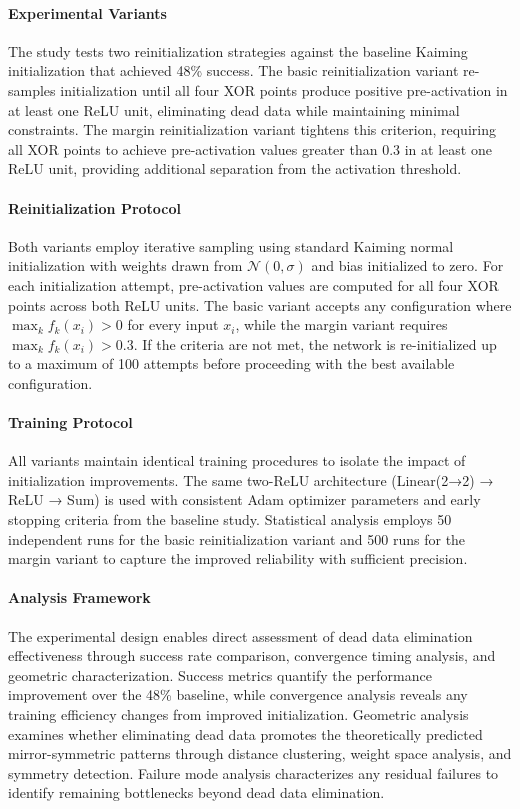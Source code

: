 \paragraph{Experimental Variants}
The study tests two reinitialization strategies against the baseline Kaiming initialization that achieved 48\% success. The basic reinitialization variant re-samples initialization until all four XOR points produce positive pre-activation in at least one ReLU unit, eliminating dead data while maintaining minimal constraints. The margin reinitialization variant tightens this criterion, requiring all XOR points to achieve pre-activation values greater than 0.3 in at least one ReLU unit, providing additional separation from the activation threshold.

\paragraph{Reinitialization Protocol}
Both variants employ iterative sampling using standard Kaiming normal initialization with weights drawn from $\mathcal{N}(0, \sigma)$ and bias initialized to zero. For each initialization attempt, pre-activation values are computed for all four XOR points across both ReLU units. The basic variant accepts any configuration where $\max_k f_k(x_i) > 0$ for every input $x_i$, while the margin variant requires $\max_k f_k(x_i) > 0.3$. If the criteria are not met, the network is re-initialized up to a maximum of 100 attempts before proceeding with the best available configuration.

\paragraph{Training Protocol}
All variants maintain identical training procedures to isolate the impact of initialization improvements. The same two-ReLU architecture (Linear(2→2) → ReLU → Sum) is used with consistent Adam optimizer parameters and early stopping criteria from the baseline study. Statistical analysis employs 50 independent runs for the basic reinitialization variant and 500 runs for the margin variant to capture the improved reliability with sufficient precision.

\paragraph{Analysis Framework}
The experimental design enables direct assessment of dead data elimination effectiveness through success rate comparison, convergence timing analysis, and geometric characterization. Success metrics quantify the performance improvement over the 48\% baseline, while convergence analysis reveals any training efficiency changes from improved initialization. Geometric analysis examines whether eliminating dead data promotes the theoretically predicted mirror-symmetric patterns through distance clustering, weight space analysis, and symmetry detection. Failure mode analysis characterizes any residual failures to identify remaining bottlenecks beyond dead data elimination.

